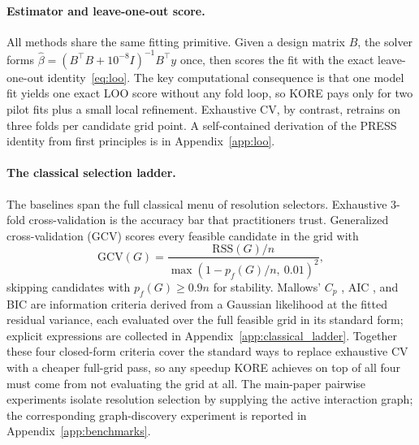 \documentclass{article}
\newcommand{\KORE}{\textsc{KORE}}
\begin{document}
\paragraph{Estimator and leave-one-out score.}
All methods share the same fitting primitive. Given a design matrix $B$, the solver forms $\hat\beta = (B^\top B + 10^{-8}I)^{-1}B^\top y$ once, then scores the fit with the exact leave-one-out identity~\eqref{eq:loo}. The key computational consequence is that one model fit yields one exact LOO score without any fold loop, so \KORE{} pays only for two pilot fits plus a small local refinement. Exhaustive CV, by contrast, retrains on three folds per candidate grid point. A self-contained derivation of the PRESS identity from first principles is in Appendix~\ref{app:loo}.

\paragraph{The classical selection ladder.}
The baselines span the full classical menu of resolution selectors. Exhaustive $3$-fold cross-validation \citep{allen1974,stone1974} is the accuracy bar that practitioners trust. Generalized cross-validation (GCV) \citep{craven1979,golub1979} scores every feasible candidate in the grid with
\begin{equation}
    \mathrm{GCV}(G) = \frac{\mathrm{RSS}(G)/n}{\max(1-p_f(G)/n,\ 0.01)^2},
    \label{eq:gcv}
\end{equation}
skipping candidates with $p_f(G) \ge 0.9 n$ for stability. Mallows' $C_p$ \citep{mallows1973}, AIC \citep{akaike1974}, and BIC \citep{schwarz1978} are information criteria derived from a Gaussian likelihood at the fitted residual variance, each evaluated over the full feasible grid in its standard form; explicit expressions are collected in Appendix~\ref{app:classical_ladder}. Together these four closed-form criteria cover the standard ways to replace exhaustive CV with a cheaper full-grid pass, so any speedup \KORE{} achieves on top of all four must come from not evaluating the grid at all. The main-paper pairwise experiments isolate resolution selection by supplying the active interaction graph; the corresponding graph-discovery experiment is reported in Appendix~\ref{app:benchmarks}.
\end{document}
